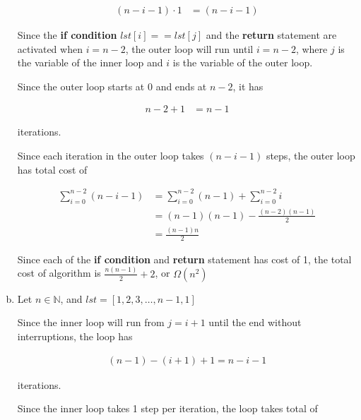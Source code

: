 \documentclass[12pt]{article}
\begin{document}
\begin{enumerate}[a.]
\begin{mdframed}
    \begin{align}
        (n-i-1) \cdot 1 &= (n-i-1)
    \end{align}

    \bigskip

    Since the \textbf{if condition} $lst[i] == lst[j]$ and the \textbf{return}
    statement are activated when $i=n-2$, the outer loop will run until $i=n-2$,
    where $j$ is the variable of the inner loop and $i$ is the variable of
    the outer loop.

    \bigskip

    Since the outer loop starts at 0 and ends at $n-2$, it has

    \begin{align}
        n-2+1 &= n-1
    \end{align}

    iterations.

    \bigskip

    Since each iteration in the outer loop takes $(n-i-1)$ steps, the outer
    loop has total cost of

    \begin{align}
        \sum\limits_{i=0}^{n-2} (n-i-1) &= \sum\limits_{i=0}^{n-2} (n-1) + \sum\limits_{i=0}^{n-2} i\\
        &= (n-1)(n-1) - \frac{(n-2)(n-1)}{2}\\
        &= \frac{(n-1)n}{2}
    \end{align}

    Since each of the \textbf{if condition} and \textbf{return} statement has cost of 1,
    the total cost of algorithm is $\frac{n(n-1)}{2} + 2$, or $\Omega(n^2)$

    \end{mdframed}

    \item

    Let $n \in \mathbb{N}$, and $lst = [1,2,3,\dots,n-1,1]$

    \bigskip

    Since the inner loop will run from $j = i + 1$ until the end without interruptions,
    the loop has

    \setcounter{equation}{0}
    \begin{align}
        (n-1)-(i+1)+1 = n-i-1
    \end{align}

    iterations.

    \bigskip

    Since the inner loop takes 1 step per iteration, the loop takes total of


\end{enumerate}
\end{document}
